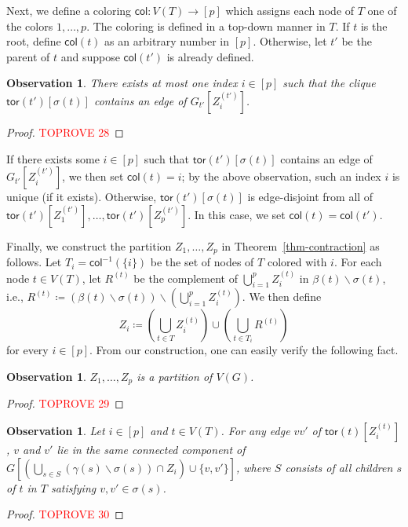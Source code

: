 \documentclass[a4paper,11pt]{article}
\numberwithin{lemma}{section}
\newtheorem{observation}[lemma]{Observation}
\newcommand{\tor}{\mathsf{tor}}
\begin{document}
Next, we define a coloring $\mathsf{col}\colon V(T) \rightarrow [p]$ which assigns each node of $T$ one of the colors $1,\dots,p$.
The coloring is defined in a top-down manner in $T$.
If $t$ is the root, define $\mathsf{col}(t)$ as an arbitrary number in $[p]$.
Otherwise, let $t'$ be the parent of $t$ and suppose $\mathsf{col}(t')$ is already defined.

\begin{observation}
There exists at most one index $i \in [p]$ such that the clique $\tor(t')[\sigma(t)]$ contains an edge of $G_{t'}[Z_i^{(t')}]$.
\end{observation}
\begin{proof}\textcolor{red}{TOPROVE 28}\end{proof}
If there exists some $i \in [p]$ such that $\tor(t')[\sigma(t)]$ contains an edge of $G_{t'}[Z_i^{(t')}]$, we then set $\mathsf{col}(t) = i$; by the above observation, such an index $i$ is unique (if it exists).
Otherwise, $\tor(t')[\sigma(t)]$ is edge-disjoint from all of $\tor(t')[Z_1^{(t')}],\dots,\tor(t')[Z_p^{(t')}]$.
In this case, we set $\mathsf{col}(t) = \mathsf{col}(t')$.

Finally, we construct the partition $Z_1,\dots,Z_p$ in Theorem~\ref{thm-contraction} as follows.
Let $T_i = \mathsf{col}^{-1}(\{i\})$ be the set of nodes of $T$ colored with $i$.
For each node $t \in V(T)$, let $R^{(t)}$ be the complement of $\bigcup_{i=1}^p Z_i^{(t)}$ in $\beta(t) \backslash \sigma(t)$, i.e., $R^{(t)} \coloneqq (\beta(t) \backslash \sigma(t)) \backslash (\bigcup_{i=1}^p Z_i^{(t)})$.
We then define
\begin{equation}
 Z_i \coloneqq \left(\bigcup_{t \in T} Z_i^{(t)}\right) \cup \left(\bigcup_{t \in T_i} R^{(t)}\right)
\end{equation}
for every $i \in [p]$.
From our construction, one can easily verify the following fact.
\begin{observation}
$Z_1,\dots,Z_p$ is a partition of $V(G)$.
\end{observation}
\begin{proof}\textcolor{red}{TOPROVE 29}\end{proof}

\begin{observation} \label{obs-connectedbottom}
Let $i \in [p]$ and $t \in V(T)$.
For any edge $vv'$ of $\tor(t)[Z_i^{(t)}]$, $v$ and $v'$ lie in the same connected component of $G[(\bigcup_{s \in S} (\gamma(s) \backslash \sigma(s)) \cap Z_i) \cup \{v,v'\}]$, where $S$ consists of all children $s$ of $t$ in $T$ satisfying $v,v' \in \sigma(s)$.
\end{observation}
\begin{proof}\textcolor{red}{TOPROVE 30}\end{proof}
\end{document}
